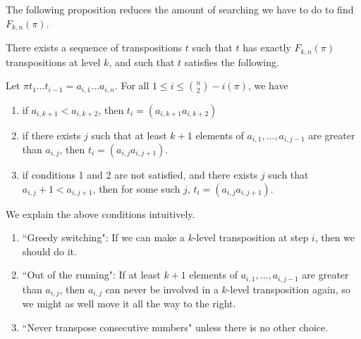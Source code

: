 \documentclass[12pt, reqno]{amsart}
\begin{document}
The following proposition reduces the amount of searching we have to do to find $F_{k,n}(\pi)$.
\begin{pr}\label{pr}
There exists a sequence of transpositions $t$ such that $t$ has exactly $F_{k,n}(\pi)$ transpositions at level $k$, and such that $t$ satisfies the following.

Let $\pi t_1\ldots t_{i-1}=a_{i,1}\ldots a_{i,n}$. For all $1\le i\le \binom n2-i(\pi)$, we have
\begin{enumerate}
\item if $a_{i,k+1}<a_{i,k+2}$, then $t_i=(a_{i,k+1}a_{i,k+2})$ %
\item if there exists $j$ such that at least $k+1$ elements of $a_{i,1},\ldots, a_{i,j-1}$ are greater than $a_{i,j}$, then $t_i=(a_{i,j}a_{i,j+1})$.
\item if conditions 1 and 2 are not satisfied, and there exists $j$ such that $a_{i,j}+1<a_{i,j+1}$, then for some such $j$, $t_i=(a_{i,j}a_{i,j+1})$.
\end{enumerate}
\end{pr}
We explain the above conditions intuitively.
\begin{enumerate}
\item ``Greedy switching": If we can make a $k$-level transposition at step $i$, then we should do it.
\item ``Out of the running": If at least $k+1$ elements of $a_{i,1},\ldots, a_{i,j-1}$ are greater than $a_{i,j}$, then $a_{i,j}$ can never be involved in a $k$-level transposition again, so we might as well move it all the way to the right.
\item ``Never transpose consecutive numbers" unless there is no other choice.
\end{enumerate}
\end{document}
